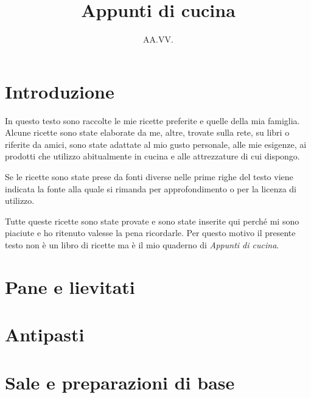 \documentclass{report}
\makeatletter
\newif\if@mainmatter \@mainmattertrue
\newcommand\frontmatter{%
    \cleardoublepage
  \@mainmatterfalse
  \pagenumbering{roman}}
\newcommand\mainmatter{%
    \cleardoublepage
  \@mainmattertrue
  \pagenumbering{arabic}}
\makeatother
\begin{document}
\title{Appunti di cucina}
\author{AA.VV.}

\maketitle
\frontmatter
\tableofcontents

\mainmatter
\chapter*{Introduzione}

In questo testo sono raccolte le mie ricette preferite e quelle della mia famiglia. Alcune ricette sono state elaborate da me, altre, trovate sulla rete, su libri o riferite da amici, sono state adattate al mio gusto personale, alle mie esigenze, ai prodotti che utilizzo abitualmente in cucina e alle attrezzature di cui dispongo.

Se le ricette sono state prese da fonti diverse nelle prime righe del testo viene indicata la fonte alla quale si rimanda per approfondimento o per la licenza di utilizzo.

Tutte queste ricette sono state provate e sono state inserite qui perché mi sono piaciute e ho ritenuto valesse la pena ricordarle. Per questo motivo il presente testo non è un libro di ricette ma è il mio quaderno di \emph{Appunti di cucina}.

%

\newpage
\chapter{Pane e lievitati}



\newpage
\chapter{Antipasti}



\newpage
\chapter{Sale e preparazioni di base}






\end{document}

